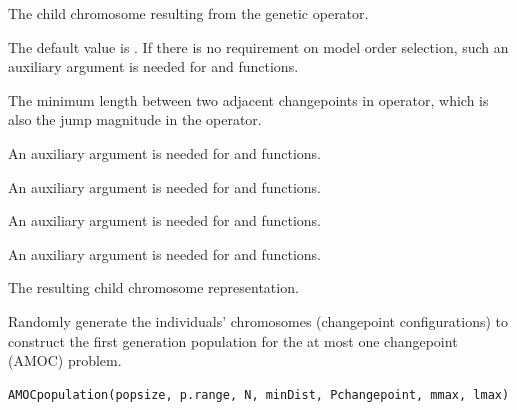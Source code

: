 \documentclass[a4paper]{book}
\begin{document}
%
\begin{Arguments}
\begin{ldescription}
\item[\code{child}] The child chromosome resulting from the  genetic
operator.

\item[\code{p.range}] The default value is . If there is no requirement
on model order selection, such an auxiliary argument is needed for 
and  functions.

\item[\code{minDist}] The minimum length between two adjacent changepoints in
 operator, which is also the jump magnitude in the
 operator.

\item[\code{Pchangepoint}] An auxiliary argument is needed for 
and  functions.

\item[\code{lmax}] An auxiliary argument is needed for  and 
functions.

\item[\code{mmax}] An auxiliary argument is needed for  and 
functions.

\item[\code{N}] An auxiliary argument is needed for  and 
functions.
\end{ldescription}
\end{Arguments}
%
\begin{Value}
The resulting child chromosome representation.
\end{Value}
%
\begin{Description}
Randomly generate the individuals' chromosomes (changepoint configurations)
to construct the first generation population for the at most one changepoint
(AMOC) problem.
\end{Description}
%
\begin{Usage}
\begin{verbatim}
AMOCpopulation(popsize, p.range, N, minDist, Pchangepoint, mmax, lmax)
\end{verbatim}
\end{Usage}
%
\end{document}
